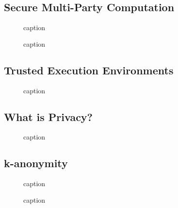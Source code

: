 \documentclass[11pt]{article}
\begin{document}
\subsection{Secure Multi-Party Computation}

\begin{figure}[H]
    \centering
    \caption{caption}
\end{figure}

\begin{figure}[H]
    \centering
    \caption{caption}
\end{figure}

\subsection{Trusted Execution Environments}

\begin{figure}[H]
    \centering
    \caption{caption}
\end{figure}

\subsection{What is Privacy?}

\begin{figure}[H]
    \centering
    \caption{caption}
\end{figure}

\subsection{k-anonymity}

\begin{figure}[H]
    \centering
    \caption{caption}
\end{figure}

\begin{figure}[H]
    \centering
    \caption{caption}
\end{figure}
\end{document}
